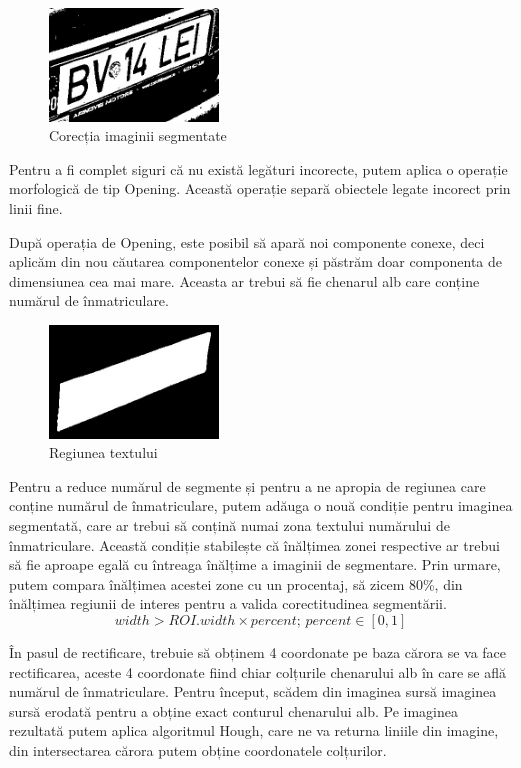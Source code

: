 \documentclass[a4paper,12pt]{report}
\begin{document}
\begin{figure}[h!]
    \centering
    \includegraphics[width=0.4\textwidth]{images/after_roi.jpg}
    \caption{Corecția imaginii segmentate}
\end{figure}
\FloatBarrier

Pentru a fi complet siguri că nu există legături incorecte, putem aplica o operație morfologică de tip Opening. Această operație separă obiectele legate incorect prin linii fine.

După operația de Opening, este posibil să apară noi componente conexe, deci aplicăm din nou căutarea componentelor conexe și păstrăm doar componenta de dimensiunea cea mai mare. Aceasta ar trebui să fie chenarul alb care conține numărul de înmatriculare.

\begin{figure}[h!]
    \centering
    \includegraphics[width=0.4\textwidth]{images/roi.jpg}
    \caption{Regiunea textului}
\end{figure}
\FloatBarrier

Pentru a reduce numărul de segmente și pentru a ne apropia de regiunea care conține numărul de înmatriculare, putem adăuga o nouă condiție pentru imaginea segmentată, care ar trebui să conțină numai zona textului numărului de înmatriculare. Această condiție stabilește că înălțimea zonei respective ar trebui să fie aproape egală cu întreaga înălțime a imaginii de segmentare. Prin urmare, putem compara înălțimea acestei zone cu un procentaj, să zicem 80\%, din înălțimea regiunii de interes pentru a valida corectitudinea segmentării.
\[
    width > ROI.width \times percent; \, percent \in [0, 1]
\]

În pasul de rectificare, trebuie să obținem 4 coordonate pe baza cărora se va face rectificarea, aceste 4 coordonate fiind chiar colțurile chenarului alb în care se află numărul de înmatriculare. Pentru început, scădem din imaginea sursă imaginea sursă erodată pentru a obține exact conturul chenarului alb. Pe imaginea rezultată putem aplica algoritmul Hough, care ne va returna liniile din imagine, din intersectarea cărora putem obține coordonatele colțurilor.
\end{document}
